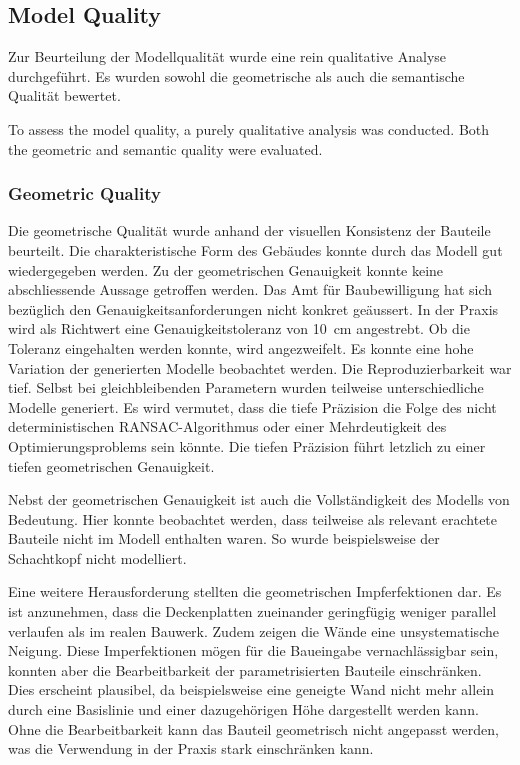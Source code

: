 \subsection{Model Quality}
\begin{German}
    Zur Beurteilung der Modellqualität wurde eine rein qualitative Analyse durchgeführt. Es wurden sowohl die geometrische als auch die semantische Qualität bewertet.
\end{German}

\begin{English}
    To assess the model quality, a purely qualitative analysis was conducted. Both the geometric and semantic quality were evaluated.
\end{English}

\subsubsection{Geometric Quality}
\begin{German}
    Die geometrische Qualität wurde anhand der visuellen Konsistenz der Bauteile beurteilt. Die charakteristische Form des Gebäudes konnte durch das Modell gut wiedergegeben werden. Zu der geometrischen Genauigkeit konnte keine abschliessende Aussage getroffen werden. Das Amt für Baubewilligung hat sich bezüglich den Genauigkeitsanforderungen nicht konkret geäussert. In der Praxis wird als Richtwert eine Genauigkeitstoleranz von 10~cm angestrebt. Ob die Toleranz eingehalten werden konnte, wird angezweifelt. Es konnte eine hohe Variation der generierten Modelle beobachtet werden. Die Reproduzierbarkeit war tief. Selbst bei gleichbleibenden Parametern wurden teilweise unterschiedliche Modelle generiert. Es wird vermutet, dass die tiefe Präzision die Folge des nicht deterministischen RANSAC-Algorithmus oder einer Mehrdeutigkeit des Optimierungsproblems sein könnte. Die tiefen Präzision führt letzlich zu einer tiefen geometrischen Genauigkeit.

    Nebst der geometrischen Genauigkeit ist auch die Vollständigkeit des Modells von Bedeutung. Hier konnte beobachtet werden, dass teilweise als relevant erachtete Bauteile nicht im Modell enthalten waren. So wurde beispielsweise der Schachtkopf nicht modelliert.

    Eine weitere Herausforderung stellten die geometrischen Impferfektionen dar. Es ist anzunehmen, dass die Deckenplatten zueinander geringfügig weniger parallel verlaufen als im realen Bauwerk. Zudem zeigen die Wände eine unsystematische Neigung. Diese Imperfektionen mögen für die Baueingabe vernachlässigbar sein, konnten aber die Bearbeitbarkeit der parametrisierten Bauteile einschränken. Dies erscheint plausibel, da beispielsweise eine geneigte Wand nicht mehr allein durch eine Basislinie und einer dazugehörigen Höhe dargestellt werden kann. Ohne die Bearbeitbarkeit kann das Bauteil geometrisch nicht angepasst werden, was die Verwendung in der Praxis stark einschränken kann.
\end{German}

